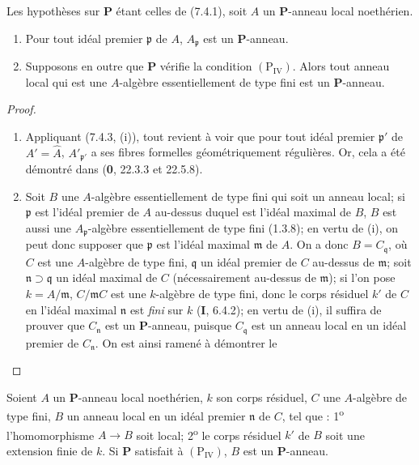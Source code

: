 \begin{theorem}[7.4.4]
\label{IV.2.s7.4.4-fr}
Les hypothèses sur $\boldsymbol P$ étant celles de \textup{(7.4.1)}, soit $A$ un
$\boldsymbol P$-anneau local noethérien.
\begin{enumerate}
\item[\emph{(i)}] Pour tout idéal premier $\mathfrak p$ de $A$,
$A_{\mathfrak p}$ est un $\boldsymbol P$-anneau.
\item[\emph{(ii)}] Supposons en outre que $\boldsymbol P$ vérifie la condition
$(\mathrm P_{\mathrm{IV}})$. Alors tout anneau local qui est une
$A$-algèbre essentiellement de type fini est un $\boldsymbol P$-anneau.
\end{enumerate}
\end{theorem}

\begin{proof}
\begin{enumerate}
\item[(i)] Appliquant (7.4.3, (i)), tout revient à voir que pour tout
idéal premier $\mathfrak p'$ de $A'=\widehat A$,
$A'_{\mathfrak p'}$ a ses fibres formelles géométriquement régulières. Or,
cela a été démontré dans (\textbf{0}, 22.3.3 et 22.5.8).


\item[(ii)] Soit $B$ une $A$-algèbre essentiellement de type fini qui
soit un anneau local; si $\mathfrak p$ est l'idéal premier de $A$ au-dessus
duquel est l'idéal maximal de $B$, $B$ est aussi une
$A_{\mathfrak p}$-algèbre essentiellement de type fini (1.3.8); en vertu de
(i), on peut donc supposer que $\mathfrak p$ est l'idéal maximal $\mathfrak m$
de $A$. On a donc $B=C_{\mathfrak q}$, où $C$ est une $A$-algèbre de type
fini, $\mathfrak q$ un idéal premier de $C$ au-dessus de $\mathfrak m$; soit
$\mathfrak n\supset\mathfrak q$ un idéal maximal de $C$ (nécessairement
au-dessus de $\mathfrak m$); si l'on pose $k=A/\mathfrak m$,
$C/\mathfrak mC$ est une $k$-algèbre de type fini, donc le corps résiduel
$k'$ de $C$ en l'idéal maximal $\mathfrak n$ est \emph{fini} sur $k$ (\textbf{I}, 6.4.2);
en vertu de (i), il suffira de prouver que $C_{\mathfrak n}$ est un
$\boldsymbol P$-anneau, puisque $C_{\mathfrak q}$ est un anneau local en un
idéal premier de $C_{\mathfrak n}$. On est ainsi ramené à démontrer le
\end{enumerate}
\end{proof}

\begin{lemma}[7.4.4.1]
\label{IV.2.s7.4.4.1-fr}
Soient $A$ un $\boldsymbol P$-anneau local noethérien, $k$ son corps
résiduel, $C$ une $A$-algèbre de type fini, $B$ un anneau local en un idéal
premier $\mathfrak n$ de $C$, tel que : 1\textsuperscript{o}
l'homomorphisme $A\to B$ soit local; 2\textsuperscript{o} le corps résiduel
$k'$ de $B$ soit une extension finie de $k$. Si $\boldsymbol P$ satisfait à
$(\mathrm P_{\mathrm{IV}})$, $B$ est un $\boldsymbol P$-anneau.
\end{lemma}


